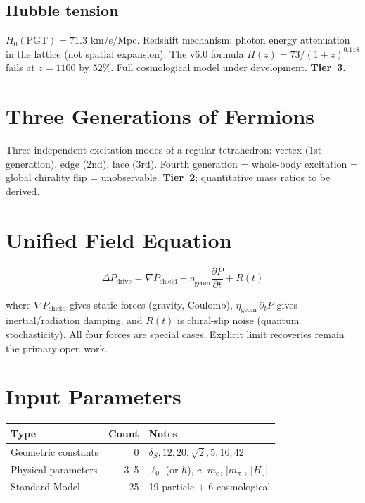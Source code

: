 \documentclass[12pt,a4paper,twocolumn]{article}
\newcommand{\dS}{\delta_{\!S}}
\newcommand{\lzero}{\ell_0}
\begin{document}
\subsection{Hubble tension}

$H_0(\mathrm{PGT}) = 71.3$ km/s/Mpc. Redshift mechanism: photon energy attenuation in the lattice (not spatial expansion). The v6.0 formula $H(z) = 73/(1+z)^{0.118}$ fails at $z=1100$ by $52\%$. Full cosmological model under development. \textbf{Tier~3.}


\section{Three Generations of Fermions}

Three independent excitation modes of a regular tetrahedron: vertex (1st generation), edge (2nd), face (3rd). Fourth generation = whole-body excitation = global chirality flip = unobservable. \textbf{Tier~2}; quantitative mass ratios to be derived.


\section{Unified Field Equation}

\begin{equation}
\Delta P_{\mathrm{drive}} = \nabla P_{\mathrm{shield}} - \eta_{\mathrm{geom}}\frac{\partial P}{\partial t} + R(t)
\label{eq:unified}
\end{equation}

where $\nabla P_{\mathrm{shield}}$ gives static forces (gravity, Coulomb), $\eta_{\mathrm{geom}}\,\partial_t P$ gives inertial/radiation damping, and $R(t)$ is chiral-slip noise (quantum stochasticity). All four forces are special cases. Explicit limit recoveries remain the primary open work.


\section{Input Parameters}

\begin{center}
\small
\begin{tabular}{@{}lrl@{}}
\toprule
Type & Count & Notes \\
\midrule
Geometric constants & 0 & $\dS,12,20,\sqrt{2},5,16,42$ \\
Physical parameters & 3--5 & $\lzero$ (or $\hbar$), $c$, $m_e$, [$m_\pi$], [$H_0$] \\
Standard Model & 25 & 19 particle $+$ 6 cosmological \\
\bottomrule
\end{tabular}
\end{center}
\end{document}
